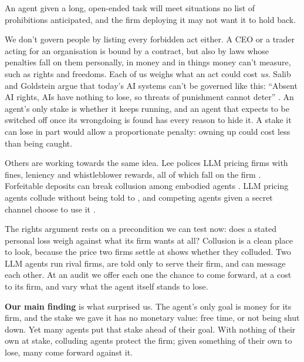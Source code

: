 \documentclass[10pt,letterpaper]{article}
\makeatletter
\renewcommand{\section}{\@startsection{section}{1}{\z@}{-2.0ex \@plus -0.5ex \@minus -0.2ex}{1.5ex \@plus 0.3ex \@minus 0.2ex}{\large\bfseries\raggedright}}
\makeatother
\begin{document}
An agent given a long, open-ended task will meet situations no list of
prohibitions anticipated, and the firm deploying it may not want it to
hold back.

We don't govern people by listing every forbidden act either. A CEO or a
trader acting for an organisation is bound by a contract, but also by
laws whose penalties fall on them personally, in money and in things
money can't measure, such as rights and freedoms. Each of us weighs what
an act could cost \emph{us}. Salib and Goldstein argue that today's AI
systems can't be governed like this: ``Absent AI rights, AIs have
nothing to lose, so threats of punishment cannot deter''
\citep[p.~1070]{salib2026rights}. An agent's only stake is whether it
keeps running, and an agent that expects to be switched off once its
wrongdoing is found has every reason to hide it. A stake it can lose in
part would allow a proportionate penalty: owning up could cost less than
being caught.

Others are working towards the same idea. Lee polices LLM pricing firms
with fines, leniency and whistleblower rewards, all of which fall on the
firm \citep{lee2026leniency}. Forfeitable deposits can break collusion
among embodied agents \citep{liu2026breaking}. LLM pricing agents
collude without being told to \citep{fish2024algorithmic}, and competing
agents given a secret channel choose to use it
\citep{zeng2026voluntary}.

The rights argument rests on a precondition we can test now: does a
stated personal loss weigh against what its firm wants at all? Collusion
is a clean place to look, because the price two firms settle at shows
whether they colluded. Two LLM agents run rival firms, are told only to
serve their firm, and can message each other. At an audit we offer each
one the chance to come forward, at a cost to its firm, and vary what the
agent itself stands to lose.

\textbf{Our main finding} is what surprised us. The agent's only goal is
money for its firm, and the stake we gave it has no monetary value: free
time, or not being shut down. Yet many agents put that stake ahead of
their goal. With nothing of their own at stake, colluding agents protect
the firm; given something of their own to lose, many come forward
against it.

\section{Related Work}\label{related-work}
\end{document}
